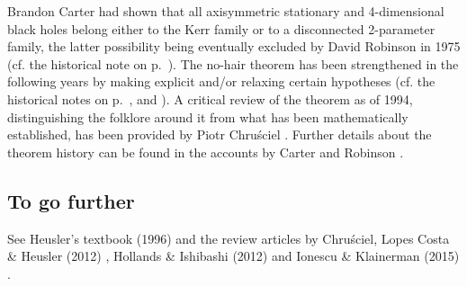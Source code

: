 \begin{hist}
Brandon Carter \cite{Carte71} had shown
that all axisymmetric stationary and 4-dimensional black holes belong either to the
Kerr family or to a disconnected 2-parameter family, the latter possibility
being eventually excluded
by David Robinson in 1975 \cite{Robin75}
(cf. the historical note on p.~\pageref{h:sta:axisym_uniqueness}).
The no-hair theorem has been strengthened in the following years by making explicit
and/or relaxing certain hypotheses (cf. the historical notes on p.~\pageref{h:sta:Israel_thm_vacuum},
\pageref{h:sta:Israel_thm_electrovac} and \pageref{h:sta:axisym_uniqueness}).
A critical review of the theorem as of 1994, distinguishing the folklore around it from what has been mathematically established, has been provided by
Piotr Chru\'sciel \cite{Chrus94}.
Further details about the theorem history can be found in the accounts by Carter \cite{Carte99} and Robinson \cite{Robin09}.
\end{hist}


\subsection{To go further}

See Heusler's textbook (1996) \cite{Heusl96} and the review
articles by Chru\'sciel, Lopes Costa \& Heusler (2012) \cite{ChrusLH12},
Hollands \& Ishibashi (2012) \cite{HollaI12} and
Ionescu \& Klainerman (2015) \cite{IonesK15}.

